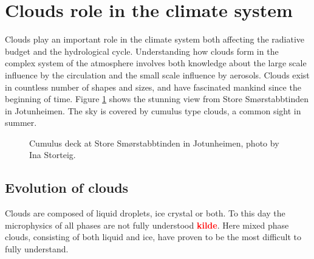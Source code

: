 \section{Clouds role in the climate system} \label{sec:cloud_in_climate_system}
Clouds play an important role in the climate system both affecting the radiative budget and the hydrological cycle. Understanding how clouds form in the complex system of the atmosphere involves both knowledge about the large scale influence by the circulation and the small scale influence by aerosols. Clouds exist in countless number of shapes and sizes, and have fascinated mankind since the beginning of time. Figure \ref{fig:cloud_cover_jotunheimen} shows the stunning view from Store Smørstabbtinden in Jotunheimen. The sky is covered by cumulus type clouds, a common sight in summer.
\begin{figure}
    \centering
    \caption[Cumulus deck at Store Smørstabbtinden in Jotunheimen]{Cumulus deck at Store Smørstabbtinden in Jotunheimen, photo by Ina Storteig.}
    \label{fig:cloud_cover_jotunheimen}
\end{figure}

\subsection{Evolution of clouds}
Clouds are composed of liquid droplets, ice crystal or both. To this day the microphysics of all phases are not fully understood \textcolor{red}{\textbf{kilde}}. Here mixed phase clouds, consisting of both liquid and ice, have proven to be the most difficult to fully understand. 

